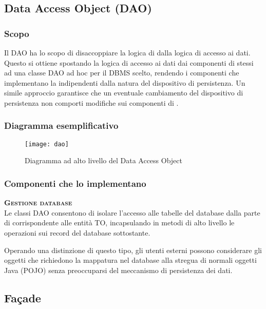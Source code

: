 \subsection{Data Access Object (DAO)}

\subsubsection{Scopo}
Il  DAO ha lo scopo di disaccoppiare la logica di  dalla logica di accesso ai dati. Questo si ottiene spostando la logica di accesso ai dati dai componenti di  stessi ad una classe DAO ad hoc per il DBMS scelto, rendendo i componenti che implementano la  indipendenti dalla natura del dispositivo di persistenza. Un simile approccio garantisce che un eventuale cambiamento del dispositivo di persistenza non comporti modifiche sui componenti di .

\subsubsection{Diagramma esemplificativo}
  \begin{figure}[H]
  \centering
  \texttt{[image: dao]}
  \caption{Diagramma ad alto livello del  Data Access Object}\label{fig:dao}
\end{figure}

\subsubsection{Componenti che lo implementano}
\begin{description}
\item{\scshape\bfseries Gestione database}\\
Le classi DAO consentono di isolare l'accesso alle tabelle del database dalla parte di  corrispondente alle entità TO, incapsulando in metodi di alto livello le operazioni sui record del database sottostante.

Operando una distinzione di questo tipo, gli utenti esterni possono considerare gli oggetti che richiedono la mappatura nel database alla stregua di normali oggetti Java (POJO) senza preoccuparsi del meccanismo di persistenza dei dati.
\end{description}

\subsection{Façade}


